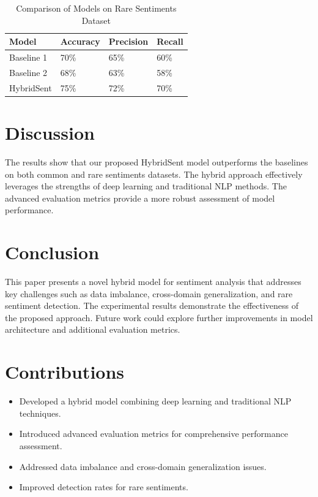 \documentclass{article}
\begin{document}
\begin{table}[ht]
    \centering
    \begin{tabularx}{\textwidth}{|X|X|X|X|}
        \hline
        \textbf{Model} & \textbf{Accuracy} & \textbf{Precision} & \textbf{Recall} \\
        \hline
        Baseline 1 & 70\% & 65\% & 60\% \\
        Baseline 2 & 68\% & 63\% & 58\% \\
        HybridSent & 75\% & 72\% & 70\% \\
        \hline
    \end{tabularx}
    \caption{Comparison of Models on Rare Sentiments Dataset}
    \label{tab:rare_sentiments}
\end{table}

\section{Discussion}
The results show that our proposed HybridSent model outperforms the baselines on both common and rare sentiments datasets. The hybrid approach effectively leverages the strengths of deep learning and traditional NLP methods. The advanced evaluation metrics provide a more robust assessment of model performance.

\section{Conclusion}
This paper presents a novel hybrid model for sentiment analysis that addresses key challenges such as data imbalance, cross-domain generalization, and rare sentiment detection. The experimental results demonstrate the effectiveness of the proposed approach. Future work could explore further improvements in model architecture and additional evaluation metrics.

\section{Contributions}
\begin{itemize}
    \item Developed a hybrid model combining deep learning and traditional NLP techniques.
    \item Introduced advanced evaluation metrics for comprehensive performance assessment.
    \item Addressed data imbalance and cross-domain generalization issues.
    \item Improved detection rates for rare sentiments.
\end{itemize}
\end{document}
